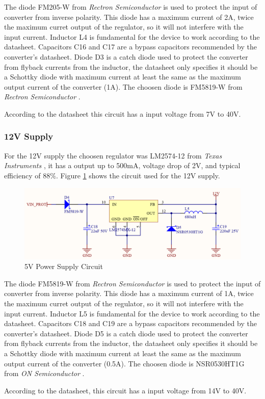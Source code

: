 			The diode FM205-W from \textit{Rectron Semiconductor} \cite{fm205-2-datasheet} is used to protect the input of converter from inverse polarity. This diode has a maximum current of 2A, twice the maximum curret output of the regulator, so it will not interfere with the input current. Inductor L4 is fundamental for the device to work according to the datasheet. Capacitors C16 and C17 are a bypass capacitors recommended by the converter's datasheet. Diode D3 is a catch diode used to protect the converter from flyback currents from the inductor, the datasheet only specifies it should be a Schottky diode with maximum current at least the same as the maximum output current of the converter (1A). The choosen diode is FM5819-W from \textit{Rectron Semiconductor} \cite{fm5819-w-datasheet}.
			\par
			According to the datasheet this circuit has a input voltage from 7V to 40V.

		\subsubsection{12V Supply}\label{sssec:12v-supply}
			For the 12V supply the choosen regulator was LM2574-12 from \textit{Texas Instruments} \cite{lm2574-12-datasheet}, it has a output up to 500mA, voltage drop of 2V, and typical efficiency of $88\%$. Figure \ref{fig:lm2574-12-circuit} shows the circuit used for the 12V supply.

			\begin{figure}[htbp]
				\centering
					\includegraphics[scale=0.4]{figuras/fig-lm2574-12-circuit.png}
				\caption{5V Power Supply Circuit\cite{lm2574-12-circuit}}
				\label{fig:lm2574-12-circuit}
			\end{figure}	

			The diode FM5819-W from \textit{Rectron Semiconductor} \cite{fm5819-w-datasheet} is used to protect the input of converter from inverse polarity. This diode has a maximum current of 1A, twice the maximum curret output of the regulator, so it will not interfere with the input current. Inductor L5 is fundamental for the device to work according to the datasheet. Capacitors C18 and C19 are a bypass capacitors recommended by the converter's datasheet. Diode D5 is a catch diode used to protect the converter from flyback currents from the inductor, the datasheet only specifies it should be a Schottky diode with maximum current at least the same as the maximum output current of the converter (0.5A). The choosen diode is NSR0530HT1G from \textit{ON Semiconductor} \cite{NSR0530HT1G-datasheet}.
			\par
			According to the datasheet, this circuit has a input voltage from 14V to 40V.	


